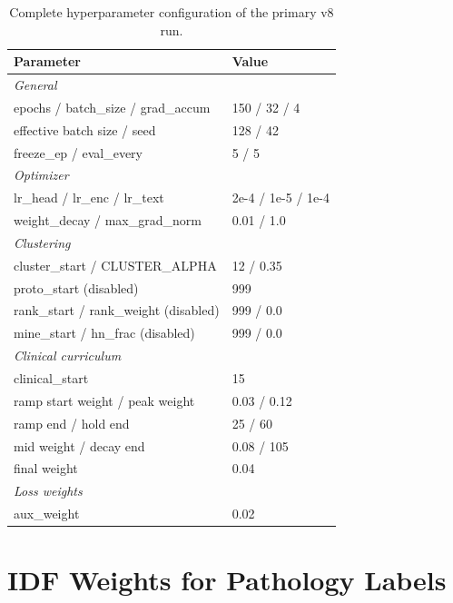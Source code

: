 \documentclass[11pt, a4paper]{article}
\begin{document}
\begin{table}[H]
  \centering
  \caption{Complete hyperparameter configuration of the primary v8 run.}
  \label{tab:fullconfig}
  \small\renewcommand{\arraystretch}{1.05}
  \begin{tabular}{ll}
    \toprule
    \textbf{Parameter} & \textbf{Value} \\
    \midrule
    \multicolumn{2}{l}{\textit{General}} \\
    epochs / batch\_size / grad\_accum   & 150 / 32 / 4 \\
    effective batch size / seed          & 128 / 42 \\
    freeze\_ep / eval\_every             & 5 / 5 \\
    \midrule
    \multicolumn{2}{l}{\textit{Optimizer}} \\
    lr\_head / lr\_enc / lr\_text        & 2e-4 / 1e-5 / 1e-4 \\
    weight\_decay / max\_grad\_norm      & 0.01 / 1.0 \\
    \midrule
    \multicolumn{2}{l}{\textit{Clustering}} \\
    cluster\_start / CLUSTER\_ALPHA      & 12 / 0.35 \\
    proto\_start (disabled)              & 999 \\
    rank\_start / rank\_weight (disabled)& 999 / 0.0 \\
    mine\_start / hn\_frac (disabled)    & 999 / 0.0 \\
    \midrule
    \multicolumn{2}{l}{\textit{Clinical curriculum}} \\
    clinical\_start                      & 15 \\
    ramp start weight / peak weight      & 0.03 / 0.12 \\
    ramp end / hold end                  & 25 / 60 \\
    mid weight / decay end               & 0.08 / 105 \\
    final weight                         & 0.04 \\
    \midrule
    \multicolumn{2}{l}{\textit{Loss weights}} \\
    aux\_weight                          & 0.02 \\
    \bottomrule
  \end{tabular}
\end{table}

\section{IDF Weights for Pathology Labels}
\label{app:idf}
\end{document}
